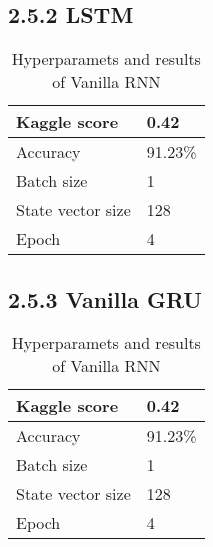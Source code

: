 \subsection*{2.5.2 LSTM}
\begin{table}[h]
\centering
\begin{tabular}{|l|l|}
\hline
 Kaggle score & 0.42 \\ \hline
 Accuracy & 91.23\% \\ \hline
 Batch size & 1 \\ \hline
 State vector size & 128 \\ \hline
 Epoch & 4 \\ \hline
\end{tabular}
\caption{Hyperparamets and results of Vanilla RNN}
\label{vanilla-table}
\end{table}
\subsection*{2.5.3 Vanilla GRU}
\begin{table}[h]
\centering
\begin{tabular}{|l|l|}
\hline
 Kaggle score & 0.42 \\ \hline
 Accuracy & 91.23\% \\ \hline
 Batch size & 1 \\ \hline
 State vector size & 128 \\ \hline
 Epoch & 4 \\ \hline
\end{tabular}
\caption{Hyperparamets and results of Vanilla RNN}
\label{vanilla-table}
\end{table}


